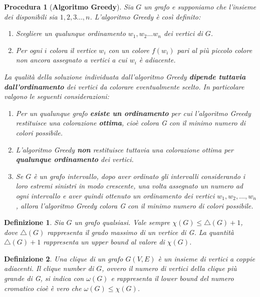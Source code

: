 \documentclass[10pt,a4paper,titlepage]{article}
\theoremstyle{break}
\newtheorem{myDef}{Definizione}
\theoremstyle{break}
\newtheorem{myProced}{Procedura}
\theoremstyle{break}
\begin{document}
\begin{myProced}[\textbf{Algoritmo Greedy}]

Sia $G$ un grafo e supponiamo che l'insieme dei disponibili sia ${1, 2, 3 \dotsc,n}$. L'algoritmo Greedy è così definito:

\begin{enumerate}
\item Scegliere un qualunque ordinamento $w_1, w_2 \dotsc w_n$ dei vertici di $G$.
\item Per ogni $i$ colora il vertice $w_i$ con un colore $f(w_i)$ pari al più piccolo colore non ancora assegnato
a vertici a cui $w_i$ è adiacente.
\end{enumerate}

La qualità della soluzione individuata dall'algoritmo Greedy \textbf{dipende tuttavia dall'ordinamento} dei vertici da colorare eventualmente scelto. In particolare valgono le seguenti considerazioni:
\begin{enumerate}
\item Per un qualunque grafo \textbf{esiste un ordinamento} per cui l'algoritmo Greedy restituisce una colorazione \textbf{ottima}, cioè colora G con il minimo numero di colori possibile.
\item L'algoritmo Greedy \textbf{non} restituisce tuttavia una colorazione ottima per \textbf{qualunque ordinamento} dei vertici.
\item Se $G$ è un \textit{grafo intervallo}, dopo aver ordinato gli intervalli considerando i loro estremi sinistri in modo crescente, una volta assegnato un numero ad ogni intervallo e aver quindi ottenuto un ordinamento dei vertici $w_1, w_2, \dotsc, w_n$, allora l'algoritmo Greedy colora G con il minimo numero di colori possibile.

\end{enumerate}

\end{myProced}

\begin{myDef}
Sia $G$ un grafo qualsiasi. Vale sempre $\chi(G) \leq \bigtriangleup(G) + 1$, dove $\bigtriangleup(G)$ rappresenta il grado massimo di un vertice di G. La quantità $\bigtriangleup(G) + 1$ rappresenta un \textit{upper bound} al valore di $\chi(G)$.
\end{myDef}

\begin{myDef}
Una \textit{clique} di un grafo $G(V, E)$ è un insieme di vertici a coppie adiacenti. Il \textit{clique number} di $G$, ovvero il numero di vertici della \textit{clique} più grande di G, si indica con $\omega(G)$ e rappresenta il \textit{lower bound} del numero cromatico cioè è vero che $\omega(G) \leq \chi(G)$. 
\end{myDef}
\end{document}
